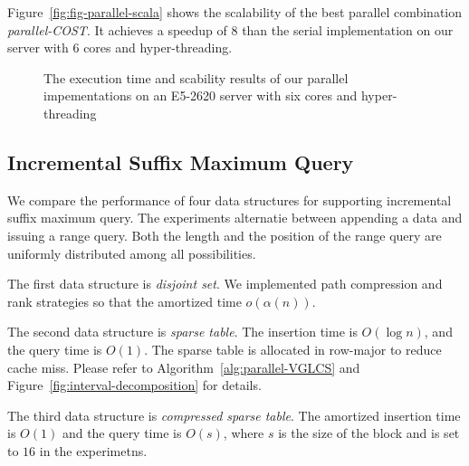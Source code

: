 Figure~\ref{fig:fig-parallel-scala} shows the scalability of the best
parallel combination {\em parallel-COST}.  It achieves a speedup of
$8$ than the serial implementation on our server with 6 cores and
hyper-threading.

\iffalse
我們運行優化策略中的空間壓縮版本，而非理論分析的 $\theta(1)$ 操作，
單次詢問落在 $O(s)$ 中，在實作上由於可以完全壓在暫存器上操作，效能表現較佳。
\fi

\begin{figure}
  \centering
  \caption{The execution time and scability results of our parallel
    impementations on an E5-2620 server with six cores and
    hyper-threading}
\end{figure}



\subsection{Incremental Suffix Maximum Query}

We compare the performance of four data structures for supporting
incremental suffix maximum query.  The experiments alternatie between
appending a data and issuing a range query.  Both the length and the
position of the range query are uniformly distributed among all
possibilities.

\iffalse
針對插入和詢問次數相同的 ISMQ 問題，運行以下四種數據結構：
\fi

The first data structure is {\em disjoint set}.  We implemented path
compression and rank strategies so that the amortized time
$o(\alpha(n))$.


The second data structure is {\em sparse table}.  The insertion time
is $O(\log n)$, and the query time is $O(1)$.  The sparse table is
allocated in row-major to reduce cache miss.  Please refer to
Algorithm~\ref{alg:parallel-VGLCS} and
Figure~\ref{fig:interval-decomposition} for details.

The third data structure is {\em compressed sparse table}.  The
amortized insertion time is $O(1)$ and the query time is $O(s)$, where
$s$ is the size of the block and is set to $16$ in the experimetns.

